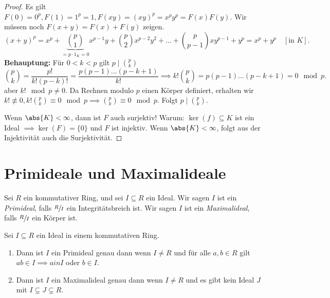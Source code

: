 \begin{proof}
	Es gilt $F(0) = 0^{p}, F(1) = 1^{p} = 1, F(xy) = (xy)^{p} = x^{p} y^{p} = F(x) F(y)$.
	Wir müssen noch $F(x+y) = F(x) + F(y)$ zeigen.
	\[
		(x+y)^{p} = x^{p} + \underbrace{\binom{p}{1}}_{=p\cdot 1_{K} = 0} x^{p-1} y + \binom{p}{2} x^{p-2} y^2 + \ldots + \binom{p}{p-1} x y^{p-1} + y^{p} = x^{p} + y^{p} 
		\quad [\text{in } K]
	.\] 
	\textbf{Behauptung:} Für $0 < k < p$ gilt $p \mid \binom{p}{k}$ 
	\[
		\binom{p}{k} = \frac{p!}{k! (p-k)!} = \frac{p (p-1) \ldots (p-k+1)}{k!} \implies k! \binom{p}{k} = p (p-1) \ldots (p-k+1) = 0 \mod p
	.\]
	aber $k! \mod p \neq 0$. Da Rechnen modulo $p$ einen Körper definiert, erhalten wir $k! \not\equiv 0, k! \binom{p}{k} \equiv 0 \mod p \implies \binom{p}{k} \equiv 0 \mod p$.
	Folgt $p \mid \binom{p}{k}$.

	Wenn $\abs{K} < \infty$, dann ist $F $ auch surjektiv!
	Warum: $\ker(f) \subseteq K$ ist ein Ideal $\implies \ker(F) = \{0\}$ und $F$ ist injektiv.
	Wenn $\abs{K} < \infty$, folgt aus der Injektivität auch die Surjektivität.
\end{proof}

\section{Primideale und Maximalideale}
\begin{definition}
	Sei $R$ ein kommutativer Ring, und sei $I \subseteq R$ ein Ideal.
	Wir sagen $I$ ist ein \emph{Primideal}, falls $\sfrac{R}{I}$ ein Integritätsbreich ist.
	Wir sagen $I$ ist ein \emph{Maximalideal}, falls $\sfrac{R}{I}$ ein Körper ist.
\end{definition}

\begin{proposition}
	Sei $I \subseteq R$ ein Ideal in einem kommutativen Ring.
	\begin{enumerate}[1)]
		\item Dann ist $I$ ein Primideal genau dann wenn $I \neq R$ und für alle $a,b \in R$ gilt $ab \in I \implies a in I $ oder $b \in I$.
		\item Dann ist $I$ ein Maximalideal genau dann wenn $I \neq R$ und es gibt kein Ideal $J$ mit $I \subsetneq J \subsetneq R$.
	\end{enumerate}
\end{proposition}


